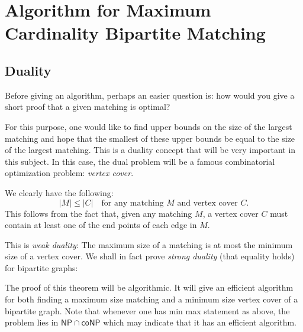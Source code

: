 % 
\section{Algorithm for Maximum Cardinality Bipartite Matching}
\subsection{Duality}

Before giving an algorithm, perhaps an easier question is: how would you give a short proof that
a given matching is optimal?

For this purpose, one would like to find upper bounds on the size of the largest matching and hope
that the smallest of these upper bounds be equal to the size of the largest matching. This is a
duality concept that will be very important in this subject. In this case, the dual problem will
be a famous combinatorial optimization problem: \emph{vertex cover}.


We clearly have the following:
\[
  |M|\le|C| \quad\text{for any matching $M$ and vertex cover $C$.}
\]
This follows from the fact that, given any matching $M$, a vertex cover $C$ must contain at least
one of the end points of each edge in $M$.

This is \emph{weak duality}: The maximum size of a matching is at most the minimum size of a
vertex cover. We shall in fact prove \emph{strong duality} (that equality holds) for bipartite
graphs:

\label{thm:konig}

The proof of this theorem will be algorithmic. It will give an efficient algorithm for both
finding a maximum size matching and a minimum size vertex cover of a bipartite graph. Note that
whenever one has min max statement as above, the problem lies in $\mathsf{NP}\cap\mathsf{coNP}$
which may indicate that it has an efficient algorithm.

\label{ex:konig}

